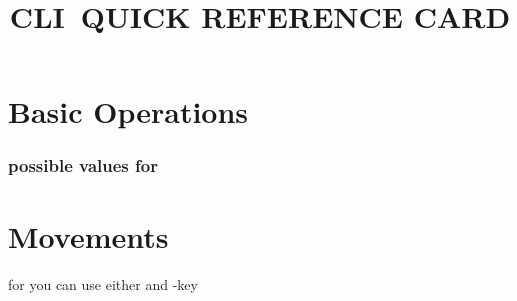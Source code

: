 

\def\content{CLI}
\def\versionnumber{1.1}  %
\def\year{2014}
\def\month{May}
\def\version{v\versionnumber\ \month\ \year}




\title{\uppercase{\content\ quick reference card}}

\def\cmdExample#1#2{
\pdfliteral{0.35 0.35 0.35 rg}
  \noindent
  \hbox to \hsize {%
    \vtop{
      \hbox to 3.2cm {
      \hskip 4pt
      \hfil
      \noindent{\tt#1}
      }
    }%
    \hfil	%
    \vtop{
      \hsize=4.90cm
      \hbox{\hfuzz = 15pt \vtop{
      \tt{#2}
      }}
    }
  }
  \par
  \vskip 1ex
\pdfliteral{0 0 0 rg}

}%

\shortintro


\section{Basic Operations}{}%

\subsubsection{possible values for }{}

\section{Movements}{for  you can use either  and -key}%

